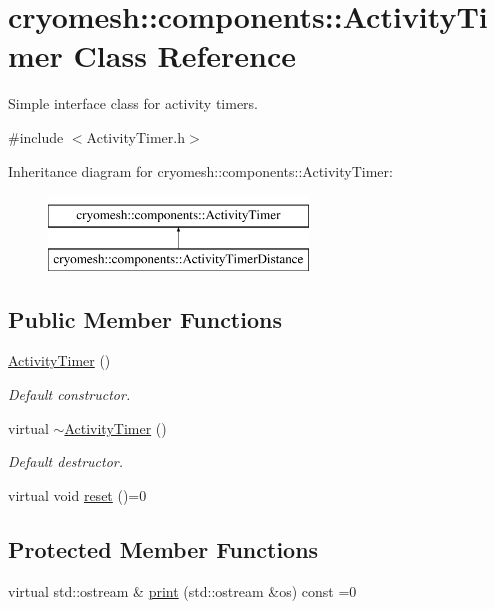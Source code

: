 \hypertarget{classcryomesh_1_1components_1_1ActivityTimer}{\section{cryomesh\-:\-:components\-:\-:\-Activity\-Timer \-Class \-Reference}
\label{classcryomesh_1_1components_1_1ActivityTimer}
}


\-Simple interface class for activity timers.  




{\ttfamily \#include $<$\-Activity\-Timer.\-h$>$}

\-Inheritance diagram for cryomesh\-:\-:components\-:\-:\-Activity\-Timer\-:\begin{figure}[H]
\begin{center}
\leavevmode
\includegraphics[height=2.000000cm]{classcryomesh_1_1components_1_1ActivityTimer}
\end{center}
\end{figure}
\subsection*{\-Public \-Member \-Functions}
\begin{DoxyCompactItemize}
\item 
\hyperlink{classcryomesh_1_1components_1_1ActivityTimer_abf1241a780f7c6fa5d626b4585afc017}{\-Activity\-Timer} ()
\begin{DoxyCompactList}\small\item\em \-Default constructor. \end{DoxyCompactList}\item 
virtual \hyperlink{classcryomesh_1_1components_1_1ActivityTimer_a8383004d633ae75433d3961bdec431cf}{$\sim$\-Activity\-Timer} ()
\begin{DoxyCompactList}\small\item\em \-Default destructor. \end{DoxyCompactList}\item 
virtual void \hyperlink{classcryomesh_1_1components_1_1ActivityTimer_a8842b0b6e73ddf1d1809b79b7b239baf}{reset} ()=0
\end{DoxyCompactItemize}
\subsection*{\-Protected \-Member \-Functions}
\begin{DoxyCompactItemize}
\item 
virtual std\-::ostream \& \hyperlink{classcryomesh_1_1components_1_1ActivityTimer_a1a4fd82c20fdc2b17ebe4582222ab8a3}{print} (std\-::ostream \&os) const =0
\end{DoxyCompactItemize}
